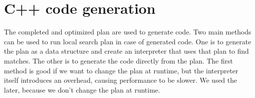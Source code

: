 \section{C++ code generation}

The completed and optimized plan are used to generate \cpp{} code. 
Two main methods can be used to run local search plan in case of generated code. 
One is to generate the plan as a data structure and create an interpreter that uses that plan to find matches. 
The other is to generate the code directly from the plan. 
The first method is good if we want to change the plan at runtime, but the interpreter itself introduces an overhead, causing performance to be slower.
We used the later, because we don't change the plan at runtime.












